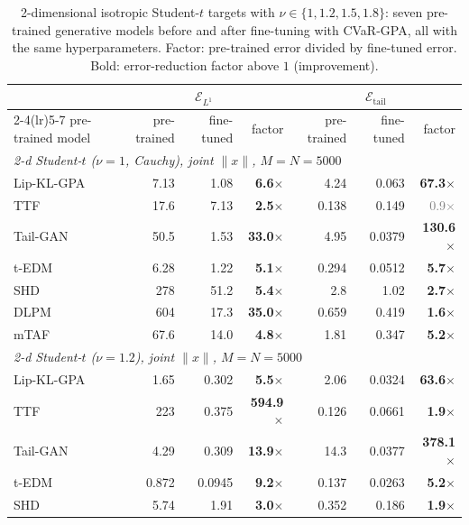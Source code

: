 \begin{table}[t]
\centering\small\setlength{\tabcolsep}{4.5pt}
\caption{{2-dimensional isotropic Student-$t$ targets with $\nu\in\{{1,}1.2,1.5,1.8\}$: seven pre-trained generative models before and after fine-tuning with CVaR-GPA, all with the same hyperparameters. Factor: pre-trained error divided by fine-tuned error. Bold: error-reduction factor above $1$ (improvement).}}
\label{tab:studentt}
\begin{tabular}{l rrr rrr}\toprule
 & \multicolumn{3}{c}{$\mathcal{E}_{L^1}$} & \multicolumn{3}{c}{$\mathcal{E}_{\mathrm{tail}}$}\\ \cmidrule(lr){2-4}\cmidrule(lr){5-7}
pre-trained model & pre-trained & fine-tuned & factor & pre-trained & fine-tuned & factor\\
\midrule
\multicolumn{7}{l}{\textit{2-d Student-$t$ ($\nu=1$, Cauchy), joint $\|x\|$, $M{=}N{=}5000$}}\\[1pt]
Lip-KL-GPA & 7.13 & 1.08 & \textbf{6.6}$\times$ & 4.24 & 0.063 & \textbf{67.3}$\times$\\
TTF & 17.6 & 7.13 & \textbf{2.5}$\times$ & 0.138 & 0.149 & \textcolor{gray}{0.9$\times$}\\
Tail-GAN & 50.5 & 1.53 & \textbf{33.0}$\times$ & 4.95 & 0.0379 & \textbf{130.6}$\times$\\
t-EDM & 6.28 & 1.22 & \textbf{5.1}$\times$ & 0.294 & 0.0512 & \textbf{5.7}$\times$\\
SHD & 278 & 51.2 & \textbf{5.4}$\times$ & 2.8 & 1.02 & \textbf{2.7}$\times$\\
DLPM & 604 & 17.3 & \textbf{35.0}$\times$ & 0.659 & 0.419 & \textbf{1.6}$\times$\\
mTAF & 67.6 & 14.0 & \textbf{4.8}$\times$ & 1.81 & 0.347 & \textbf{5.2}$\times$\\
\midrule
\multicolumn{7}{l}{\textit{2-d Student-$t$ ($\nu=1.2$), joint $\|x\|$, $M{=}N{=}5000$}}\\[1pt]
Lip-KL-GPA & 1.65 & 0.302 & \textbf{5.5}$\times$ & 2.06 & 0.0324 & \textbf{63.6}$\times$\\
TTF & 223 & 0.375 & \textbf{594.9}$\times$ & 0.126 & 0.0661 & \textbf{1.9}$\times$\\
Tail-GAN & 4.29 & 0.309 & \textbf{13.9}$\times$ & 14.3 & 0.0377 & \textbf{378.1}$\times$\\
t-EDM & 0.872 & 0.0945 & \textbf{9.2}$\times$ & 0.137 & 0.0263 & \textbf{5.2}$\times$\\
SHD & 5.74 & 1.91 & \textbf{3.0}$\times$ & 0.352 & 0.186 & \textbf{1.9}$\times$\\

\end{tabular}
\end{table}
